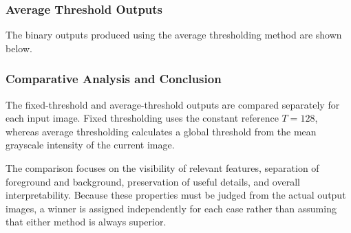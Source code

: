
\subsubsection{Average Threshold Outputs}
\startimplementationimages

The binary outputs produced using the average thresholding method are shown below.

\begin{center}
\hfill
{}\par\vspace{0.8em}

\hfill
{}\par\vspace{0.8em}

\hfill
{}\par\vspace{0.8em}

\hfill
{}
\end{center}


\subsubsection{Comparative Analysis and Conclusion}
\label{sec:comparison}

The fixed-threshold and average-threshold outputs are compared separately for each input image. Fixed thresholding uses the constant reference $T=128$, whereas average thresholding calculates a global threshold from the mean grayscale intensity of the current image.

The comparison focuses on the visibility of relevant features, separation of foreground and background, preservation of useful details, and overall interpretability. Because these properties must be judged from the actual output images, a winner is assigned independently for each case rather than assuming that either method is always superior.

